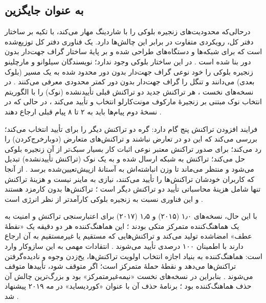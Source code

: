 \subsection{ به عنوان جایگزین}

درحالی‌که  محدودیت‌های زنجیره بلوکی را با شاردینگ مهار می‌کند،  با تکیه بر ساختار دفتر کل، رویکردی متفاوت در برابر این چالش‌ها دارد.  یک فناوری دفتر کل توزیع‌شده است که برای شبکه‌ها و دستگاه‌های  طراحی شده و بر پایهٔ ساختار گراف جهت‌دار بدون دور بنا شده است \cite{sealeyIOTATangle202022, IOTATANGLE20, silvanoIotaTangleCryptocurrency2020}. در این ساختار بلوکی وجود ندارد؛ نویسندگان سیلوانو و مارچلینو زنجیره بلوکی را خود نوعی گراف جهت‌دار بدون دور محدود شده به یک مسیر (بلوک بعدی) می‌دانند و تنگل را گراف جهت‌دار بدون دور کمتر محدودی معرفی می‌کنند \cite{silvanoIotaTangleCryptocurrency2020}. در نسخه‌های نخست ، هر تراکنش جدید دو تراکنش قبلی تأییدنشده (نوک) را با الگوریتم انتخاب نوک مبتنی بر زنجیرهٔ مارکوف مونت‌کارلو انتخاب و تأیید می‌کند \cite{silvanoIotaTangleCryptocurrency2020}، در حالی که در نسخهٔ دوم پیام‌ها باید به ۲ تا ۸ پیام قبلی ارجاع دهند \cite{IOTATANGLE20, sealeyIOTATangle202022}.

فرایند افزودن تراکنش پنج گام دارد: گره دو تراکنش دیگر را برای تأیید انتخاب می‌کند؛ بررسی می‌کند که این دو در تعارض نباشند و تراکنش‌های متعارض (دوبارخرج‌کردن) را رد می‌کند؛ برای صدور تراکنش معتبر نوعی اثبات کار بسیار سبک‌تر از آن زنجیره بلوکی حل می‌کند؛ تراکنش به شبکه ارسال شده و به یک نوک (تراکنش تأییدنشده) تبدیل می‌شود و منتظر می‌ماند تا وزن انباشته‌اش به آستانهٔ از‌پیش‌تعیین‌شده برسد \cite{silvanoIotaTangleCryptocurrency2020}. از آنجا که کاربران خودشان تراکنش‌ها را تأیید می‌کنند، نیازی به ماینر نیست و هزینهٔ تراکنش تنها شامل هزینهٔ محاسباتی تأیید دو تراکنش دیگر است \cite{silvanoIotaTangleCryptocurrency2020}؛ تراکنش‌ها بدون کارمزد هستند \cite{silvanoIotaTangleCryptocurrency2020, IOTATANGLE20} و این فناوری نسبت به زنجیره بلوکی کارآمدتر از نظر انرژی است \cite{silvanoIotaTangleCryptocurrency2020, sealeyIOTATangle202022, IOTATANGLE20}.

با این حال، نسخه‌های ۱٫۰ (۲۰۱۵) و ۱٫۵ (۲۰۱۷)  برای اعتبارسنجی تراکنش و امنیت به یک هماهنگ‌کننده متمرکز متکی بودند \cite{IOTATANGLE20}؛ این هماهنگ‌کننده هر دو دقیقه یک «نقطهٔ عطف» امضاشده تولید می‌کند و تراکنش‌هایی که مستقیم یا غیرمستقیم به آن ارجاع دارند با اطمینان ۱۰۰ درصدی تأیید می‌شوند \cite{silvanoIotaTangleCryptocurrency2020}. انتقادات مهمی به این سازوکار وارد است: هماهنگ‌کننده به بنیاد  اجازه انتخاب اولویت تراکنش‌ها، یخ‌زدن وجوه و نادیده‌گرفتن تراکنش‌ها می‌دهد و نقطهٔ حملهٔ متمرکز است؛ اگر متوقف شود، تأییدها متوقف می‌شوند \cite{silvanoIotaTangleCryptocurrency2020}. بنابراین  در نسخه‌های نخست «نیمه‌غیرمتمرکز» بود و بزرگ‌ترین چالش آن حذف هماهنگ‌کننده بود \cite{silvanoIotaTangleCryptocurrency2020}؛ برنامهٔ حذف آن با عنوان «کوردیساید» در مه ۲۰۱۹ پیشنهاد شد \cite{silvanoIotaTangleCryptocurrency2020}.

